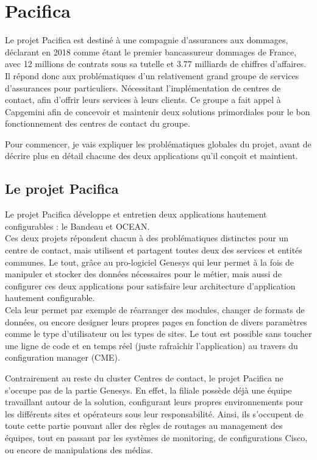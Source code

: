 \documentclass{rapport}
\begin{document}
\newpage

\section{Pacifica}

Le projet Pacifica est destiné à une compagnie d'assurances aux dommages, déclarant en 2018 comme étant le premier bancassureur dommages de France, avec 12 millions de contrats sous sa tutelle et 3.77 milliards de chiffres d'affaires.\\

Il répond donc aux problématiques d'un relativement grand groupe de services d'assurances pour particuliers. Nécessitant l'implémentation de centres de contact, afin d'offrir leurs services à leurs clients. Ce groupe a fait appel à Capgemini afin de concevoir et maintenir deux solutions primordiales pour le bon fonctionnement des centres de contact du groupe.

Pour commencer, je vais expliquer les problématiques globales du projet, avant de décrire plus en détail chacune des deux applications qu'il conçoit et maintient.


\subsection{Le projet Pacifica}

Le projet Pacifica développe et entretien deux applications hautement configurables : le Bandeau et OCEAN.\\
Ces deux projets répondent chacun à des problématiques distinctes pour un centre de contact, mais utilisent et partagent toutes deux des services et entités communes. Le tout, grâce au pro-logiciel Genesys qui leur permet à la fois de manipuler et stocker des données nécessaires pour le métier, mais aussi de configurer ces deux applications pour satisfaire leur architecture d'application hautement configurable.\\
Cela leur permet par exemple de réarranger des modules, changer de formats de données, ou encore designer leurs propres pages en fonction de divers paramètres comme le type d'utilisateur ou les types de sites. Le tout est possible sans toucher une ligne de code et en temps réel (juste rafraîchir l'application) au travers du configuration manager (CME).

Contrairement au reste du cluster Centres de contact, le projet Pacifica ne s'occupe pas de la partie Genesys. En effet, la filiale possède déjà une équipe travaillant autour de la solution, configurant leurs propres environnements pour les différents sites et opérateurs sous leur responsabilité. Ainsi, ils s'occupent de toute cette partie pouvant aller des règles de routages au management des équipes, tout en passant par les systèmes de monitoring, de configurations Cisco, ou encore de manipulations des médias.\\
\end{document}
